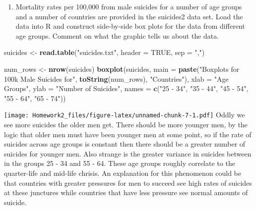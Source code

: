 \documentclass[]{article}
\newenvironment{Shaded}{\begin{snugshade}}{\end{snugshade}}
\newcommand{\KeywordTok}[1]{\textcolor[rgb]{0.13,0.29,0.53}{\textbf{#1}}}
\newcommand{\DataTypeTok}[1]{\textcolor[rgb]{0.13,0.29,0.53}{#1}}
\newcommand{\StringTok}[1]{\textcolor[rgb]{0.31,0.60,0.02}{#1}}
\newcommand{\OtherTok}[1]{\textcolor[rgb]{0.56,0.35,0.01}{#1}}
\newcommand{\NormalTok}[1]{#1}
\providecommand{\tightlist}{%
  \setlength{\itemsep}{0pt}\setlength{\parskip}{0pt}}
\begin{document}
\begin{enumerate}
\def\labelenumi{\arabic{enumi}.}
\setcounter{enumi}{1}
\tightlist
\item
  Mortality rates per 100,000 from male suicides for a number of age
  groups and a number of countries are provided in the suicides2 data
  set. Load the data into R and construct side-by-side box plots for the
  data from different age groups. Comment on what the graphic tells us
  about the data.
\end{enumerate}

\begin{Shaded}
\begin{Highlighting}[]
\NormalTok{suicides <-}\StringTok{ }\KeywordTok{read.table}\NormalTok{(}\StringTok{"suicides.txt"}\NormalTok{, }\DataTypeTok{header =} \OtherTok{TRUE}\NormalTok{, }\DataTypeTok{sep =} \StringTok{","}\NormalTok{)}
\end{Highlighting}
\end{Shaded}

\begin{Shaded}
\begin{Highlighting}[]
\NormalTok{num_rows <-}\StringTok{ }\KeywordTok{nrow}\NormalTok{(suicides)}
\KeywordTok{boxplot}\NormalTok{(suicides,}
        \DataTypeTok{main =} \KeywordTok{paste}\NormalTok{(}\StringTok{"Boxplots for 100k Male Suicides for"}\NormalTok{, }\KeywordTok{toString}\NormalTok{(num_rows), }\StringTok{"Countries"}\NormalTok{),}
        \DataTypeTok{xlab =} \StringTok{"Age Groups"}\NormalTok{,}
        \DataTypeTok{ylab =} \StringTok{"Number of Suicides"}\NormalTok{,}
        \DataTypeTok{names =} \KeywordTok{c}\NormalTok{(}\StringTok{"25 - 34"}\NormalTok{, }\StringTok{"35 - 44"}\NormalTok{, }\StringTok{"45 - 54"}\NormalTok{, }\StringTok{"55 - 64"}\NormalTok{, }\StringTok{"65 - 74"}\NormalTok{))}
\end{Highlighting}
\end{Shaded}

\texttt{[image: Homework2\_files/figure-latex/unnamed-chunk-7-1.pdf]}
Oddly we see more suicides the older men get. There should be more
younger men, by the logic that older men must have been younger men at
some point, so if the rate of suicides across age groups is constant
then there should be a greater number of suicides for younger men. Also
strange is the greater variance in suicides between in the groups 25 -
34 and 55 - 64. These age groups roughly correlate to the quarter-life
and mid-life chrisis. An explanation for this phenomenon could be that
countries with greater pressures for men to succeed see high rates of
suicides at these junctures while countries that have less pressure see
normal amounts of suicide.
\end{document}
